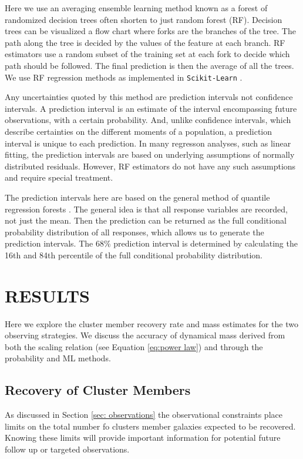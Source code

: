 \documentclass[fleqn,usenatbib]{mnras}
\begin{document}
Here we use an averaging ensemble learning method known as a forest of randomized decision trees often shorten to just random forest (RF). Decision trees can be visualized a flow chart where forks are the branches of the tree. The path along the tree is decided by the values of the feature at each branch. RF estimators use a random subset of the training set at each fork to decide which path should be followed. The final prediction is then the average of all the trees. We use RF regression methods as implemented in {\tt Scikit-Learn} \citep{Pedregosa2012}.

Any uncertainties quoted by this method are prediction intervals not confidence intervals. A prediction interval is an estimate of the interval encompassing future observations, with a certain probability. And, unlike confidence intervals, which describe certainties on the different moments of a population, a prediction interval is unique to each prediction. In many regresson analyses, such as linear fitting, the prediction intervals are based on underlying assumptions of normally distributed residuals. However, RF estimators do not have any such assumptions and require special treatment.

The prediction intervals here are based on the general method of quantile regression forests \citep{Meinshausen2006}. The general idea is that all response variables are recorded, not just the mean. Then the prediction can be returned as the full conditional probability distribution of all responses, which allows us to generate the prediction intervals. The 68\% prediction interval is determined by calculating the 16th and 84th percentile of the full conditional probability distribution. 

\section{RESULTS}\label{sec: results}
Here we explore the cluster member recovery rate and mass estimates for the two observing strategies. We discuss the accuracy of dynamical mass derived from both the scaling relation (see Equation \ref{eq:power law}) and through the probability and ML methods.

\subsection{Recovery of Cluster Members}
As discussed in Section \ref{sec: observations} the observational constraints place limits on the total number fo clusters member galaxies expected to be recovered. Knowing these limits will provide important information for potential future follow up or targeted observations. 
\end{document}
